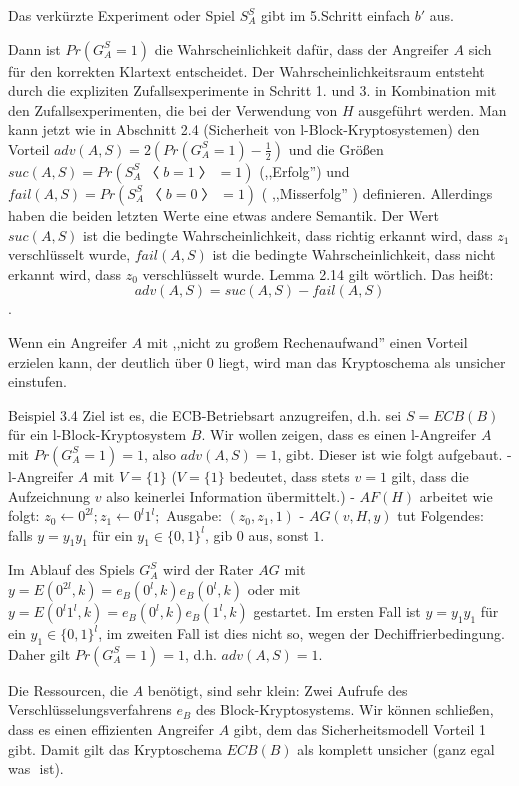 \documentclass[a4paper]{article}
\begin{document}
\begin{multicols}{3}
Das verkürzte Experiment oder Spiel $S^S_A$ gibt im 5.Schritt einfach $b′$ aus.

Dann ist  $Pr(G^S_A = 1)$ die Wahrscheinlichkeit dafür, dass der Angreifer $A$ sich für den korrekten Klartext entscheidet. Der Wahrscheinlichkeitsraum entsteht durch die expliziten Zufallsexperimente in Schritt 1. und 3. in Kombination mit den Zufallsexperimenten, die bei der Verwendung von $H$ ausgeführt werden. Man kann jetzt wie in Abschnitt 2.4 (Sicherheit von l-Block-Kryptosystemen) den Vorteil $adv(A,S) = 2(Pr(G^S_A= 1)-\frac{1}{2})$ und die Größen $suc(A,S) = Pr(S^S_A〈b= 1〉= 1)$ (,,Erfolg'') und $fail(A,S) = Pr(S_A^S〈b= 0〉= 1)$ ( ,,Misserfolg'' ) definieren. Allerdings haben die beiden letzten Werte eine etwas andere Semantik. Der Wert $suc(A,S)$ ist die bedingte Wahrscheinlichkeit, dass richtig erkannt wird, dass $z_1$ verschlüsselt wurde, $fail(A,S)$ ist die bedingte Wahrscheinlichkeit, dass nicht erkannt wird, dass $z_0$ verschlüsselt wurde. Lemma 2.14 gilt wörtlich. Das heißt: $$adv(A,S) = suc(A,S)-fail(A,S)$$.

Wenn ein Angreifer $A$ mit ,,nicht zu großem Rechenaufwand'' einen Vorteil erzielen kann, der deutlich über $0$ liegt, wird man das Kryptoschema als unsicher einstufen.

Beispiel 3.4 Ziel ist es, die ECB-Betriebsart anzugreifen, d.h. sei $S=ECB(B)$ für ein l-Block-Kryptosystem $B$. Wir wollen zeigen, dass es einen l-Angreifer $A$ mit $Pr(G^S_A= 1) = 1$, also $adv(A,S) = 1$, gibt. Dieser ist wie folgt aufgebaut.
- l-Angreifer $A$ mit $V=\{1\}$ ($V=\{1\}$ bedeutet, dass stets $v=1$ gilt, dass die Aufzeichnung $v$ also keinerlei Information übermittelt.)
- $AF(H)$ arbeitet wie folgt: $z_0\leftarrow 0^{2l}; z_1\leftarrow 0^l 1^l;$ Ausgabe: $(z_0,z_1 ,1)$
- $AG(v,H,y)$ tut Folgendes: falls $y=y_1y_1$ für ein $y_1\in\{0,1\}^l$, gib $0$ aus, sonst $1$.

Im Ablauf des Spiels $G^S_A$ wird der Rater $AG$ mit $y=E(0^{2l},k)=e_B(0^l,k)e_B(0^l,k)$ oder mit $y=E(0^l 1^l,k)=e_B(0^l,k)e_B(1^l,k)$ gestartet. Im ersten Fall ist $y=y_1y_1$ für ein $y_1\in\{0,1\}^l$, im zweiten Fall ist dies nicht so, wegen der Dechiffrierbedingung. Daher gilt $Pr(G^S_A= 1) = 1$, d.h. $adv(A,S) = 1$.

Die Ressourcen, die $A$ benötigt, sind sehr klein: Zwei Aufrufe des Verschlüsselungsverfahrens $e_B$ des Block-Kryptosystems. Wir können schließen, dass es einen effizienten Angreifer $A$ gibt, dem das Sicherheitsmodell Vorteil 1 gibt. Damit gilt das Kryptoschema $ECB(B)$ als komplett unsicher (ganz egal was $$ ist).


\end{multicols}
\end{document}
